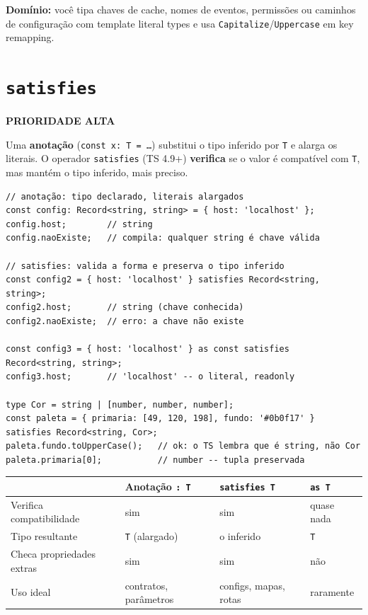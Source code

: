 \documentclass[12pt,a4paper,oneside]{book}
\newcommand{\alta}{\colorbox{red!15}{\sffamily\scriptsize\bfseries PRIORIDADE ALTA}}
\newcommand{\code}[1]{\texttt{#1}}
\newcommand{\dom}[1]{\begin{dominio}\textbf{Domínio:} #1\end{dominio}}
\begin{document}
\dom{você tipa chaves de cache, nomes de eventos, permissões ou caminhos de configuração com template literal types e usa \code{Capitalize}/\code{Uppercase} em key remapping.}

\section{\texttt{satisfies}}
\label{sec:satisfies}
\alta

Uma \textbf{anotação} (\code{const x: T = \ldots}) substitui o tipo inferido por \code{T} e alarga os literais. O operador \code{satisfies} (TS 4.9+) \textbf{verifica} se o valor é compatível com \code{T}, mas mantém o tipo inferido, mais preciso.

\begin{verbatim}
// anotação: tipo declarado, literais alargados
const config: Record<string, string> = { host: 'localhost' };
config.host;        // string
config.naoExiste;   // compila: qualquer string é chave válida

// satisfies: valida a forma e preserva o tipo inferido
const config2 = { host: 'localhost' } satisfies Record<string, string>;
config2.host;       // string (chave conhecida)
config2.naoExiste;  // erro: a chave não existe

const config3 = { host: 'localhost' } as const satisfies Record<string, string>;
config3.host;       // 'localhost' -- o literal, readonly

type Cor = string | [number, number, number];
const paleta = { primaria: [49, 120, 198], fundo: '#0b0f17' } satisfies Record<string, Cor>;
paleta.fundo.toUpperCase();   // ok: o TS lembra que é string, não Cor
paleta.primaria[0];           // number -- tupla preservada
\end{verbatim}

\begin{center}
\begin{tabular}{@{}llll@{}}
\toprule
 & \textbf{Anotação \code{: T}} & \textbf{\code{satisfies T}} & \textbf{\code{as T}} \\
\midrule
Verifica compatibilidade & sim & sim & quase nada \\
Tipo resultante & \code{T} (alargado) & o inferido & \code{T} \\
Checa propriedades extras & sim & sim & não \\
Uso ideal & contratos, parâmetros & configs, mapas, rotas & raramente \\
\bottomrule
\end{tabular}
\end{center}
\end{document}
